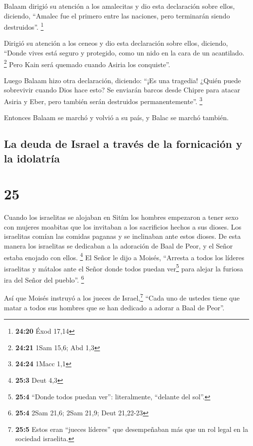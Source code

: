  Balaam dirigió su atención a los amalecitas y dio esta
declaración sobre ellos, diciendo, ``Amalec fue el primero entre las
naciones, pero terminarán siendo destruidos''. \footnote{\textbf{24:20}
  Éxod 17,14}

 Dirigió su atención a los ceneos y dio esta declaración
sobre ellos, diciendo, ``Donde vives está seguro y protegido, como un
nido en la cara de un acantilado. \footnote{\textbf{24:21} 1Sam 15,6;
  Abd 1,3}  Pero Kain será quemado cuando Asiria los
conquiste''.

 Luego Balaam hizo otra declaración, diciendo: ``¡Es una
tragedia! ¿Quién puede sobrevivir cuando Dios hace esto? 
Se enviarán barcos desde Chipre para atacar Asiria y Eber, pero también
serán destruidos permanentemente''. \footnote{\textbf{24:24} 1Macc 1,1}

 Entonces Balaam se marchó y volvió a su país, y Balac se
marchó también.

\hypertarget{la-deuda-de-israel-a-travuxe9s-de-la-fornicaciuxf3n-y-la-idolatruxeda}{%
\subsection{La deuda de Israel a través de la fornicación y la
idolatría}\label{la-deuda-de-israel-a-travuxe9s-de-la-fornicaciuxf3n-y-la-idolatruxeda}}

\hypertarget{section-24}{%
\section{25}\label{section-24}}

 Cuando los israelitas se alojaban en Sitím los hombres
empezaron a tener sexo con mujeres moabitas  que los
invitaban a los sacrificios hechos a sus dioses. Los israelitas comían
las comidas paganas y se inclinaban ante estos dioses.  De
esta manera los israelitas se dedicaban a la adoración de Baal de Peor,
y el Señor estaba enojado con ellos. \footnote{\textbf{25:3} Deut 4,3}
 El Señor le dijo a Moisés, ``Arresta a todos los líderes
israelitas y mátalos ante el Señor donde todos puedan ver\footnote{\textbf{25:4}
  ``Donde todos puedan ver'': literalmente, ``delante del sol''.} para
alejar la furiosa ira del Señor del pueblo''. \footnote{\textbf{25:4}
  2Sam 21,6; 2Sam 21,9; Deut 21,22-23}

 Así que Moisés instruyó a los jueces de
Israel,\footnote{\textbf{25:5} Estos eran ``jueces líderes'' que
  desempeñaban más que un rol legal en la sociedad israelita.} ``Cada
uno de ustedes tiene que matar a todos sus hombres que se han dedicado a
adorar a Baal de Peor''.

